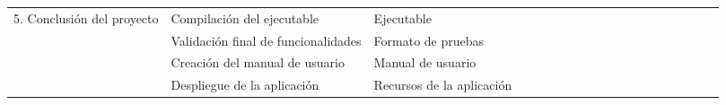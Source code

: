 \begin{table}[H]
\begin{adjustbox}{width={\textwidth},totalheight={\textheight},keepaspectratio}
\begin{tabular}{cp{10.555em}p{10.555em}rrrrrrrrrrrrrrrr}
        \cline{1-3}\multicolumn{1}{c}{\multirow{4}[8]{*}{5. Conclusión del proyecto}} & Compilación del ejecutable & \multicolumn{1}{l}{Ejecutable} &   &   &   &   &   &   &   &   &   &   &   &   & \cellcolor[rgb]{ .957,  .69,  .518} & \cellcolor[rgb]{ .957,  .69,  .518} &   &  \bigstrut\\
        \cline{2-3}  & Validación final de funcionalidades & Formato de pruebas &   &   &   &   &   &   &   &   &   &   &   &   & \cellcolor[rgb]{ .988,  .894,  .839} & \cellcolor[rgb]{ .988,  .894,  .839} &   &  \bigstrut\\
        \cline{2-3}  & Creación del manual de usuario & Manual de usuario &   &   &   &   &   &   &   &   &   &   &   &   &   & \cellcolor[rgb]{ .957,  .69,  .518} & \cellcolor[rgb]{ .957,  .69,  .518} &  \bigstrut\\
        \cline{2-3}  & Despliegue de la aplicación & Recursos de la aplicación &   &   &   &   &   &   &   &   &   &   &   &   &   &   &   & \cellcolor[rgb]{ .988,  .894,  .839} \bigstrut\\
        \hline
    \end{tabular}%
    \end{adjustbox}
    \label{tab:crono2}
\end{table}

